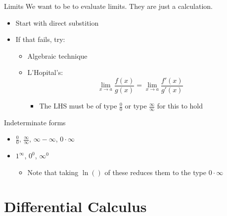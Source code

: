 \documentclass{beamer}
\begin{document}
\begin{frame}[label={sec:org4009a94}]{Limits}
We want to be to evaluate limits. They are just a calculation.

\begin{itemize}
\item Start with direct substition
\item If that fails, try:
\begin{itemize}
\item Algebraic technique
\item L'Hopital's: 
\[
      \lim_{x\to a} \frac{f(x)}{g(x)} = \lim_{x\to a} \frac{f'(x)}{g'(x)}
      \]

\begin{itemize}
\item \alert{The LHS must be of type \(\frac00\) or type \(\frac{\infty}{\infty}\) for this to hold}
\end{itemize}
\end{itemize}
\end{itemize}

\begin{block}{Indeterminate forms}
\begin{itemize}
\item \(\frac00\), \(\frac{\infty}{\infty}\), \(\infty-\infty\), \(0\cdot\infty\)
\item \(1^\infty\), \(0^0\), \(\infty^0\)
\begin{itemize}
\item Note that taking \(\ln()\) of these reduces them to the type \(0 \cdot \infty\)
\end{itemize}
\end{itemize}
\end{block}
\end{frame}

\section{Differential Calculus}
\end{document}
